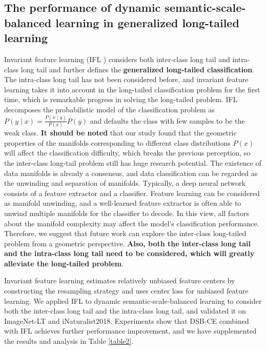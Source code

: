 \documentclass[10pt]{article} %
\begin{document}
\iffalse
\subsection{The performance of dynamic semantic-scale-balanced learning in generalized long-tailed learning\label{H.3}}

Invariant feature learning (IFL \cite{paper115}) considers both inter-class long tail and intra-class long tail and further defines the \textbf{generalized long-tailed classification}. The intra-class long tail has not been considered before, and invariant feature learning takes it into account in the long-tailed classification problem for the first time, which is remarkable progress in solving the long-tailed problem. IFL decomposes the probabilistic model of the classification problem as $P(y\mid x)=\frac{P(x\mid y)}{P(x)}P(y) $ and defaults the class with few samples to be the weak class. \textbf{It should be noted} that our study found that the geometric properties of the manifolds corresponding to different class distributions $P(x)$ will affect the classification difficulty, which breaks the previous perception, so the inter-class long-tail problem still has huge research potential. The existence of data manifolds is already a consensus, and data classification can be regarded as the unwinding and separation of manifolds. Typically, a deep neural network consists of a feature extractor and a classifier. Feature learning can be considered as manifold unwinding, and a well-learned feature extractor is often able to unwind multiple manifolds for the classifier to decode. In this view, all factors about the manifold complexity may affect the model's classification performance. Therefore, we suggest that future work can explore the inter-class long-tailed problem from a geometric perspective. \textbf{Also, both the inter-class long tail and the intra-class long tail need to be considered, which will greatly alleviate the long-tailed problem}.

Invariant feature learning estimates relatively unbiased feature centers by constructing the resampling strategy and uses center loss for unbiased feature learning. We applied IFL to dynamic semantic-scale-balanced learning to consider both the inter-class long tail and the intra-class long tail, and validated it on ImageNet-LT and iNaturalist2018. Experiments show that DSB-CE combined with IFL achieves further performance improvement, and we have supplemented the results and analysis in Table \ref{table2}.
\end{document}
